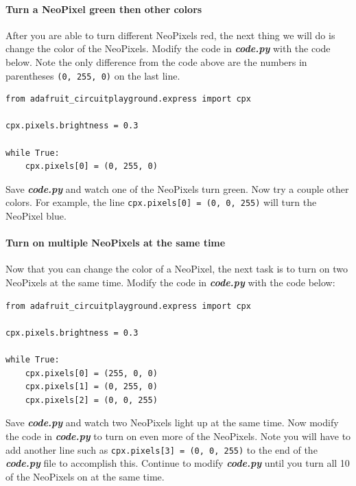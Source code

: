 \documentclass[11pt]{article}
\begin{document}
\hypertarget{turn-a-neopixel-green-then-other-colors}{%
\paragraph{Turn a NeoPixel green then other
colors}\label{turn-a-neopixel-green-then-other-colors}}

After you are able to turn different NeoPixels red, the next thing we
will do is change the color of the NeoPixels. Modify the code in
\textbf{\emph{code.py}} with the code below. Note the only difference
from the code above are the numbers in parentheses
\texttt{(0,\ 255,\ 0)} on the last line.

\begin{verbatim}
from adafruit_circuitplayground.express import cpx

cpx.pixels.brightness = 0.3

while True:
    cpx.pixels[0] = (0, 255, 0)
\end{verbatim}

Save \textbf{\emph{code.py}} and watch one of the NeoPixels turn green.
Now try a couple other colors. For example, the line
\texttt{cpx.pixels{[}0{]}\ =\ (0,\ 0,\ 255)} will turn the NeoPixel
blue.

\hypertarget{turn-on-multiple-neopixels-at-the-same-time}{%
\paragraph{Turn on multiple NeoPixels at the same
time}\label{turn-on-multiple-neopixels-at-the-same-time}}

Now that you can change the color of a NeoPixel, the next task is to
turn on two NeoPixels at the same time. Modify the code in
\textbf{\emph{code.py}} with the code below:

\begin{verbatim}
from adafruit_circuitplayground.express import cpx

cpx.pixels.brightness = 0.3

while True:
    cpx.pixels[0] = (255, 0, 0)
    cpx.pixels[1] = (0, 255, 0)
    cpx.pixels[2] = (0, 0, 255)
\end{verbatim}

Save \textbf{\emph{code.py}} and watch two NeoPixels light up at the
same time. Now modify the code in \textbf{\emph{code.py}} to turn on
even more of the NeoPixels. Note you will have to add another line such
as \texttt{cpx.pixels{[}3{]}\ =\ (0,\ 0,\ 255)} to the end of the
\textbf{\emph{code.py}} file to accomplish this. Continue to modify
\textbf{\emph{code.py}} until you turn all 10 of the NeoPixels on at the
same time.
\end{document}
